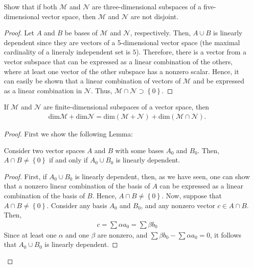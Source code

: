 \documentclass[12pt]{article}
\newenvironment{lemma}[2][Lemma]{\begin{trivlist} \item[\hskip \labelsep {\bfseries #1}\hskip \labelsep {\bfseries #2.}]}{\end{trivlist}}
\newenvironment{problem}[2][Problem]{\begin{trivlist} \item[\hskip \labelsep {\bfseries #1}\hskip \labelsep {\bfseries #2.}]}{\end{trivlist}}
\begin{document}
\begin{problem}{7}
\begin{enumerate}
  \item Show that if both $\mathcal{M}$ and $\mathcal{N}$ are three-dimensional subspaces of a five-dimensional vector space, then $\mathcal{M}$ and $\mathcal{N}$ are not disjoint.
\begin{proof}
  Let $A$ and $B$ be bases of $\mathcal{M}$ and $\mathcal{N}$, respectively. Then, $A\cup B$ is linearly dependent since they are vectors of a 5-dimensional vector space (the maximal cardinality of a lineraly independent set is $5$). Therefore, there is a vector from a vector subspace that can be expressed as a linear combination of the others, where at least one vector of the other subspace has a nonzero scalar. Hence, it can easily be shown that a linear combination of vectors of $\mathcal{M}$ and be expressed as a linear combination in $\mathcal{N}$. Thus, $\mathcal{M}\cap\mathcal{N} \supset \left\{ 0 \right\}$.  
\end{proof}
  \item If $\mathcal{M}$ and $\mathcal{N}$ are finite-dimensional subspaces of a vector space, then
\begin{align*}
  \text{dim}\mathcal{M} + \text{dim}\mathcal{N} = \text{dim}(\mathcal{M}+\mathcal{N}) + \text{dim}(\mathcal{M}\cap\mathcal{N}).
\end{align*}
\begin{proof}
  First we show the following Lemma:
  \begin{lemma}{21}
    Consider two vector spaces $A$ and $B$ with some bases $A_{0}$ and $B_{0}$. Then, $A\cap B\neq \left\{ 0 \right\}$ if and only if $A_{0}\cup B_{0}$ is linearly dependent.
\begin{proof}
  First, if $A_{0}\cup B_{0}$ is linearly dependent, then, as we have seen, one can show that a nonzero linear combination of the basis of $A$ can be expressed as a linear combination of the basis of $B$. Hence, $A\cap B\neq \left\{ 0 \right\}$. Now, suppose that $A\cap B\neq \left\{ 0 \right\}$. Consider any basis $A_{0}$ and $B_{0}$, and any nonzero vector $c\in A\cap B$. Then, 
\begin{align*}
  c = \sum \alpha a_{0} = \sum \beta b_{0}
\end{align*}
Since at least one $\alpha$ and one $\beta$ are nonzero, and $\sum \beta b_{0} - \sum \alpha a_{0} = 0$, it follows that $A_{0}\cup B_{0}$ is linearly dependent.
\end{proof}
\end{lemma}

\end{proof}
\end{enumerate}
\end{problem}
\end{document}
